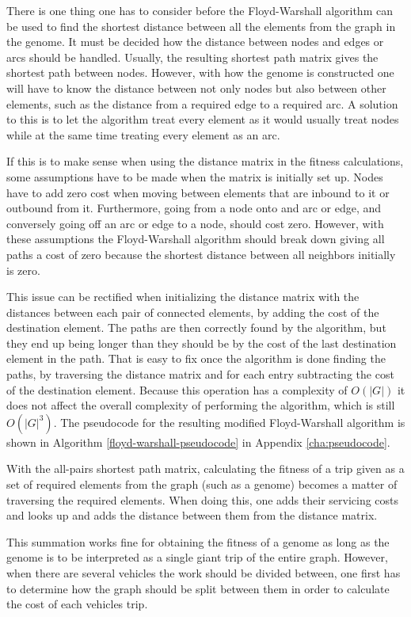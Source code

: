 There is one thing one has to consider before the Floyd-Warshall algorithm can be used to find the shortest distance between all the elements from the graph in the genome. It must be decided how the distance between nodes and edges or arcs should be handled. Usually, the resulting shortest path matrix gives the shortest path between nodes. However, with how the genome is constructed one will have to know the distance between not only nodes but also between other elements, such as the distance from a required edge to a required arc. A solution to this is to let the algorithm treat every element as it would usually treat nodes while at the same time treating every element as an arc.

If this is to make sense when using the distance matrix in the fitness calculations, some assumptions have to be made when the matrix is initially set up. Nodes have to add zero cost when moving between elements that are inbound to it or outbound from it. Furthermore, going from a node onto and arc or edge, and conversely going off an arc or edge to a node, should cost zero. However, with these assumptions the Floyd-Warshall algorithm should break down giving all paths a cost of zero because the shortest distance between all neighbors initially is zero.

This issue can be rectified when initializing the distance matrix with the distances between each pair of connected elements, by adding the cost of the destination element. The paths are then correctly found by the algorithm, but they end up being longer than they should be by the cost of the last destination element in the path. That is easy to fix once the algorithm is done finding the paths, by traversing the distance matrix and for each entry subtracting the cost of the destination element. Because this operation has a complexity of $O(|G|)$ it does not affect the overall complexity of performing the algorithm, which is still $O(|G|^3)$. The pseudocode for the resulting modified Floyd-Warshall algorithm is shown in Algorithm \ref{floyd-warshall-pseudocode} in Appendix \ref{cha:pseudocode}.



With the all-pairs shortest path matrix, calculating the fitness of a trip given as a set of required elements from the graph (such as a genome) becomes a matter of traversing the required elements. When doing this, one adds their servicing costs and looks up and adds the distance between them from the distance matrix.

This summation works fine for obtaining the fitness of a genome as long as the genome is to be interpreted as a single giant trip of the entire graph. However, when there are several vehicles the work should be divided between, one first has to determine how the graph should be split between them in order to calculate the cost of each vehicles trip.

